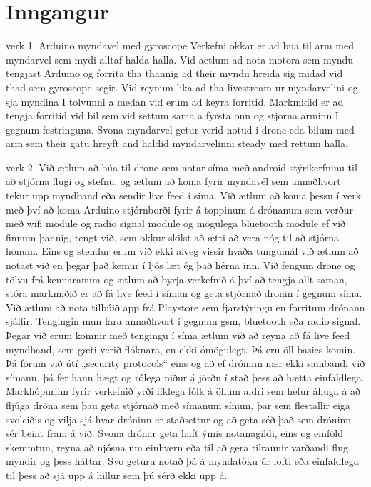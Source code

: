 \section{Inngangur}
verk 1.
Arduino myndavel med gyroscope
Verkefni okkar er ad bua til arm med myndarvel sem mydi alltaf halda halla.  Vid aetlum ad nota motora sem myndu tengjast Arduino og forrita tha thannig ad their myndu hreida sig midad vid thad sem gyroscope segir. Vid reynum lika ad tha livestream ur myndarvelini og sja myndina I tolvunni a medan vid erum ad keyra forritid. Markmidid er ad tengja forritid vid bil sem vid settum sama a fyrsta onn og stjorna arminn I gegnum festringuna. Svona myndarvel getur verid notud i drone eda bilum med arm sem their gatu hreyft and haldid myndarvelinni steady med rettum halla.

verk 2.
Við ætlum að búa til drone sem notar síma með android stýrikerfninu til að stjórna flugi og stefnu, og ætlum að koma fyrir myndavél sem annaðhvort tekur upp myndband eða sendir live feed í síma.
Við ætlum að koma þessu í verk með því að koma Arduino stjórnborði fyrir á toppinum á drónanum sem verður með wifi module og radio signal module  og mögulega bluetooth module ef við finnum þannig, tengt við, sem okkur skilst að ætti að vera nóg til að stjórna honum. Eins og stendur erum við ekki alveg vissir hvaða tungumál við ætlum að notast við en þegar það kemur í ljós læt ég það hérna inn. 
Við fengum drone og tölvu frá kennaranum og ætlum að byrja verkefnið á því að tengja allt saman, stóra markmiðið er að fá live feed í síman og geta stjórnað dronin í gegnum síma. Við ætlum að nota tilbúið app frá Playstore sem fjarstýringu en forritum drónann sjálfir. Tengingin mun fara annaðhvort í gegnum gsm, bluetooth eða radio signal. Þegar við erum komnir með tengingu í síma ætlum við að reyna að fá live feed myndband, sem gæti verið flóknara, en ekki ómögulegt. Þá eru öll basics komin. Þá förum við útí „security protocols“ eins og að ef dróninn nær ekki sambandi við símann, þá fer hann hægt og rólega niður á jörðu í stað þess að hætta einfaldlega.
Markhópurinn fyrir verkefnið yrði líklega fólk á öllum aldri sem hefur áhuga á að fljúga dróna sem þau geta stjórnað með símanum sínum, þar sem flestallir eiga svoleiðis og vilja sjá hvar dróninn er staðsettur og að geta séð það sem dróninn sér beint fram á við. 
Svona drónar geta haft ýmis notanagildi, eins og einföld skemmtun, reyna að njósna um einhvern eða til að gera tilraunir varðandi flug, myndir og þess háttar. Svo geturu notað þá á myndatöku úr lofti eða einfaldlega til þess að sjá upp á hillur sem þú sérð ekki upp á.
